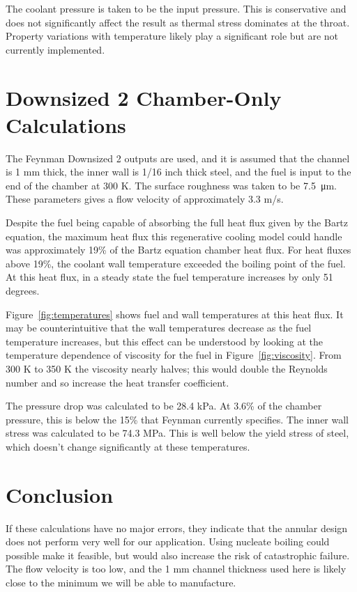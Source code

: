 \documentclass[11pt]{article}
\begin{document}
The coolant pressure is taken to be the input pressure. This is conservative and does not significantly affect the result as thermal stress dominates at the throat. Property variations with temperature likely play a significant role but are not currently implemented.

\section{Downsized 2 Chamber-Only Calculations}

The Feynman Downsized 2 outputs are used, and it is assumed that the channel is 1 mm thick, the inner wall is 1/16 inch thick steel, and the fuel is input to the end of the chamber at 300 K. The surface roughness was taken to be \SI{7.5}{\micro\meter}. These parameters gives a flow velocity of approximately 3.3 m/s.

Despite the fuel being capable of absorbing the full heat flux given by the Bartz equation, the maximum heat flux this regenerative cooling model could handle was approximately 19\% of the Bartz equation chamber heat flux. For heat fluxes above 19\%, the coolant wall temperature exceeded the boiling point of the fuel. At this heat flux, in a steady state the fuel temperature increases by only 51 degrees.

Figure~\ref{fig:temperatures} shows fuel and wall temperatures at this heat flux. It may be counterintuitive that the wall temperatures decrease as the fuel temperature increases, but this effect can be understood by looking at the temperature dependence of viscosity for the fuel in Figure~\ref{fig:viscosity}. From 300 K to 350 K the viscosity nearly halves; this would double the Reynolds number and so increase the heat transfer coefficient.

The pressure drop was calculated to be 28.4 kPa. At 3.6\% of the chamber pressure, this is below the 15\% that Feynman currently specifies. The inner wall stress was calculated to be 74.3 MPa. This is well below the yield stress of steel, which doesn't change significantly at these temperatures.

\section{Conclusion}

If these calculations have no major errors, they indicate that the annular design does not perform very well for our application. Using nucleate boiling could possible make it feasible, but would also increase the risk of catastrophic failure. The flow velocity is too low, and the 1 mm channel thickness used here is likely close to the minimum we will be able to manufacture.
\end{document}
